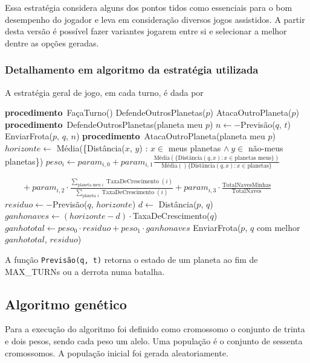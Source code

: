 \documentclass[a4paper,titlepage,11pt]{article}
\newcommand\PROC{\STATE\textbf{procedimento}\ }
\begin{document}
Essa estratégia considera alguns dos pontos tidos como essenciais para o bom desempenho do jogador e leva em consideração diversos jogos assistidos. A partir desta versão é possível fazer variantes jogarem entre si e selecionar a melhor dentre as opções geradas.

\subsubsection{Detalhamento em algoritmo da estratégia utilizada}

A estratégia geral de jogo, em cada turno, é dada por

\begin{algorithmic}
	\PROC FaçaTurno()
	\FORALL {planeta meu $p$}
		\STATE DefendeOutrosPlanetas($p$)
		\STATE AtacaOutroPlaneta($p$)
	\ENDFOR
	\STATE 
	\PROC DefendeOutrosPlanetas(planeta meu $p$)
			\STATE $n \gets  -$Previsão($q$, $t$)
				\STATE EnviarFrota($p$, $q$, $n$)
			\ENDIF
		\ENDIF
	\ENDFOR
	\STATE
	\PROC AtacaOutroPlaneta(planeta meu $p$)
	\STATE $horizonte \gets$ Média(\{Distância($x$, $y$) : $x \in$ meus planetas $\wedge\ y \in$ não-meus planetas\})
			\STATE $\displaystyle peso_i \gets param_{i, 0} + param_{i,1}\frac{\text{Média}(\{\text{Distância}(q, x) : x \in \text{planetas meus}\})}{\text{Média}()\{\text{Distância}(q, x) : x \in \text{planetas}\}}$
			
			$\displaystyle \qquad + param_{i,2}\cdot\frac{\sum_{\text{planeta meu }i} \operatorname{TaxaDeCrescimento}(i)}{\sum_{\text{planeta }i} \operatorname{TaxaDeCrescimento}(i)} + param_{i,3}\cdot\frac{\text{TotalNavesMinhas}}{\text{TotalNaves}}$
		\ENDFOR
			\STATE $residuo \gets -$Previsão($q$, $horizonte$)
				\STATE $d \gets$ Distância($p$, $q$)
				\STATE $ganhonaves \gets (horizonte-d)\cdot$TaxaDeCrescimento($q$)
				\STATE $ganhototal \gets peso_0 \cdot residuo + peso_1 \cdot ganhonaves$
			\ENDIF
		\ENDIF
	\ENDFOR
	\STATE EnviarFrota($p$, $q$ com melhor $ganhototal$, $residuo$)
\end{algorithmic}

A função \verb|Previsão(q, t)|  retorna o estado de um planeta ao fim de MAX\_TURNs ou a derrota numa batalha.

\subsection{Algoritmo genético}
Para a execução do algoritmo foi definido como cromossomo o conjunto de trinta e dois pesos, sendo cada peso um alelo. Uma população é o conjunto de sessenta cromossomos. A população inicial foi gerada aleatoriamente.
\end{document}

